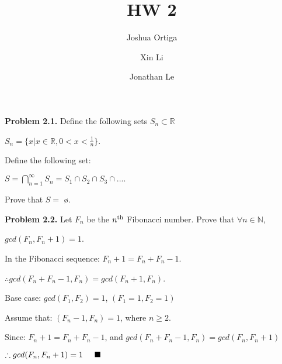 \documentclass{article}
\title{HW 2}
\author{Joshua Ortiga \\
		\and
		Xin Li \\
		\and
		Jonathan Le}
\begin{document}
\maketitle
\textbf{Problem 2.1.} Define the following sets $S_n \subset \mathbb{R}$

\begin{center}
	$S_n = \{x|x \in \mathbb{R}, 0 < x < \frac{1}{n}\}$.
\end{center}

\hspace{1cm} Define the following set:

\begin{center}
	$S = \displaystyle\bigcap_{n=1}^{\infty} S_n = S_1 \cap S_2 \cap S_3 \cap ....$
\end{center}

\hspace{1cm} Prove that $S = $ \o.

\vspace{0.5cm}

\textbf{Problem 2.2.} Let $F_n$ be the $n\textsuperscript{th}$ Fibonacci number. Prove that $\forall n \in \mathbb{N}$, 

$gcd(F_n,F_n+1) = 1$.

\vspace{0.3cm}

In the Fibonacci sequence: $F_n+1 = F_n + F_n-1$.

\vspace{0.2cm}

$\therefore gcd(F_n + F_n-1, F_n) = gcd(F_n+1, F_n)$.

\vspace{0.2cm}

Base case: $gcd(F_1, F_2) = 1$, \hspace{0.2cm} $(F_1 = 1, F_2 = 1)$

\vspace{0.2cm}

Assume that: $(F_n-1, F_n) = 1$, \hspace{0.2cm} where $n \geq 2$.

\vspace{0.2cm}

Since: $F_n+1 = F_n + F_n-1$, and $gcd(F_n + F_n-1, F_n) = gcd(F_n, F_n+1)$

\vspace{0.2cm}

$\therefore gcd(F_n, F_n+1) = 1 \hspace{0.5cm} \blacksquare$

\vspace{0.5cm}
\end{document}
